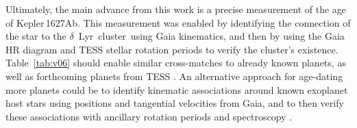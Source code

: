 \documentclass[12pt,modern,twocolumn,tighten]{aastex63}
\newcommand{\cn}{$\delta$\ Lyr\ cluster} %
\newcommand{\pn}{Kepler\,1627Ab} %
\begin{document}
Ultimately, the main advance from this work is a precise measurement of
the age of \pn.   This measurement was enabled by identifying the
connection of the star to the \cn\ using Gaia kinematics, and then by
using the Gaia HR diagram and TESS stellar rotation periods to verify the
cluster's existence.
Table~\ref{tab:v06} should enable similar cross-matches to already
known planets, as well as forthcoming planets from TESS
\citep{guerrero_tess_2021}.  An alternative
approach for age-dating more planets could be to identify kinematic
associations around known exoplanet host stars using positions and
tangential velocities from Gaia, and to then verify these associations
with ancillary rotation periods and spectroscopy \citep[{\it
e.g.},][]{tofflemire_tess_2021}.




\acknowledgements
\raggedbottom
\end{document}
